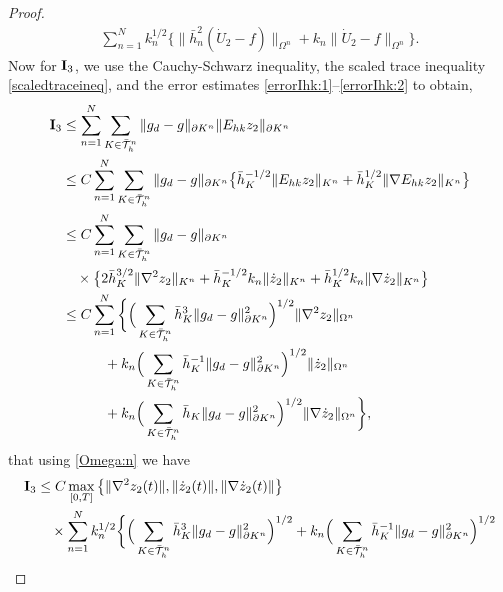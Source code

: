 \documentclass{amsart}
\numberwithin{equation}{section}
\theoremstyle{definition}
\begin{document}
\begin{proof}
\begin{equation}
\begin{split}
     \sum_{n=1}^N k_n^{1/2}
     \big\{
     \|\bar h_n^{2}(\dot U_2-f)\|_{\Omega^n}
     +k_n\|\dot U_2-f\|_{\Omega^n}
     \big\}.
  \end{split}
\end{equation}
Now for ${\rm{\bf I}}_3$, we use the Cauchy-Schwarz inequality,
the scaled trace inequality \eqref{scaledtraceineq}, 
and the error estimates 
\eqref{errorIhk:1}--\eqref{errorIhk:2} to obtain,
\begin{equation*}   
  \begin{split}
  {\rm{\bf I}}_3
    &\le \sum_{n=1}^N\sum_{K\in\bar{\mathcal T}_h^n}
      \|g_d-g\|_{\partial K^n}
      \|E_{hk}z_2\|_{\partial K^n}\\
    &\le C\sum_{n=1}^N\sum_{K\in\bar{\mathcal T}_h^n}
      \|g_d-g\|_{\partial K^n}
      \big\{
     \bar h_K^{-1/2}\|E_{hk}z_2\|_{K^n}+\bar h_K^{1/2}\|\nabla E_{hk}z_2\|_{K^n}
      \big\}\\
    &\le C\sum_{n=1}^N\sum_{K\in\bar{\mathcal T}_h^n}
      \|g_d-g\|_{\partial K^n}\\
    &\quad \times
      \big\{
      2\bar h_K^{3/2}\|\nabla^{2} z_2\|_{K^n}
      +\bar h_K^{-1/2}k_n\|\dot z_2\|_{K^n}
      +\bar h_K^{1/2}k_n\|\nabla \dot z_2\|_{K^n}
      \big\}\\
    &\le C\sum_{n=1}^N
      \bigg\{
      \Big(\sum_{K\in\bar{\mathcal T}_h^n}\bar h_K^{3}\|g_d-g\|_{\partial K^n}^2
      \Big)^{1/2} \| \nabla^{2}z_2\|_{\Omega^n}\\
    &\quad\quad\quad 
      +k_n
      \Big(\sum_{K\in\bar{\mathcal T}_h^n}\bar h_K^{-1}\|g_d-g\|_{\partial K^n}^2
      \Big)^{1/2} \|\dot z_2\|_{\Omega^n}\\
    &\quad\quad\quad 
      +k_n
      \Big(\sum_{K\in\bar{\mathcal T}_h^n}\bar h_K\|g_d-g\|_{\partial K^n}^2
      \Big)^{1/2} \|\nabla\dot z_2\|_{\Omega^n}\bigg\},
  \end{split}
\end{equation*}
that using \eqref{Omega:n} we have
\begin{equation}   \label{aposteriori2:est4}
  \begin{split}
  {\rm{\bf I}}_3
    &\le C\max_{[0,T]}\big\{\|\nabla^{2}z_2(t)\|,
     \|\dot z_2(t)\|,
     \|\nabla\dot z_2(t)\|\big\}\\
    &\quad\times \sum_{n=1}^N k_n^{1/2}
    \bigg\{
    \Big(\sum_{K\in\bar{\mathcal T}_h^n}\bar h_K^{3}\|g_d-g\|_{\partial K^n}^2
    \Big)^{1/2}
    +k_n
    \Big(\sum_{K\in\bar{\mathcal T}_h^n}\bar h_K^{-1}\|g_d-g\|_{\partial K^n}^2
    \Big)^{1/2}\\

\end{split}
\end{equation}
\end{proof}
\end{document}

